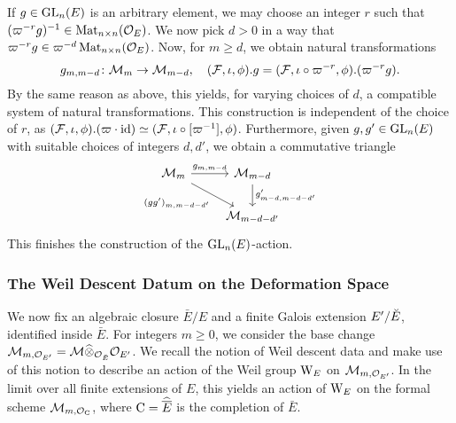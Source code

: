 \documentclass[../main.tex]{subfiles}
\begin{document}
If $g \in \operatorname{GL}_n(E)$ is an arbitrary element, we may choose an integer $r$ such
that $(\varpi^{-r} g)^{-1} \in \operatorname{Mat}_{n \times n}(\mathcal{O}_E)$. We now pick 
$d > 0$ in a way that $\varpi^{-r}g \in \varpi^{-d}\operatorname{Mat}_{n \times n}(\mathcal{O}_E)$. 
Now, for $m \geq d$, we obtain natural transformations
\begin{equation*}
  g_{m,m-d}\colon \mathcal{M}_{m} \to \mathcal{M}_{m-d}, \quad (\mathcal{F}, \iota, \phi).g = (\mathcal{F}, \iota \circ \varpi^{-r}, \phi).(\varpi^{-r}g).
\end{equation*}
By the same reason as above, this yields, for varying choices of $d$, a
compatible system of natural transformations.
This construction is independent of the choice of $r$, as $(\mathcal{F}, \iota,
\phi).(\varpi\cdot\operatorname{id}) \simeq (\mathcal{F}, \iota \circ [\varpi^{-1}], \phi)$.
Furthermore, given $g, g' \in \operatorname{GL}_n(E)$ with suitable choices of integers 
$d, d'$, we obtain a commutative triangle
\begin{equation*}
\begin{tikzcd}[ampersand replacement=\&]
	{\cM_{m}} \& {\cM_{m-d}} \\
	\& {\cM_{m-d-d'}}
	\arrow["{g_{m,m-d}}", from=1-1, to=1-2]
	\arrow["{(gg')_{m,m-d-d'}}"', from=1-1, to=2-2]
	\arrow["{g'_{m-d,m-d-d'}}", from=1-2, to=2-2]
\end{tikzcd}
\end{equation*}
This finishes the construction of the $\operatorname{GL}_n(E)$-action.


\subsubsection{The Weil Descent Datum on the Deformation Space} %
\label{ssub:The Weil Descent Datum}
We now fix an algebraic closure
$\bar E/E$ and a finite Galois extension $E'/{\breve {E}}$, identified inside $\bar E$. 
For integers $m \geq 0$, we consider the base change $\mathcal{M}_{m, \mathcal{O}_{{E'}}} = \mathcal{M}
\widehat \otimes_{\mathcal{O}_{\breve {E}}} \mathcal{O}_{{E'}}$. 
We recall the notion of Weil descent data and make use of this notion to describe
an action of the Weil group $\mathrm W_E$ on $\mathcal{M}_{m, \mathcal{O}_{{E'}}}$. In the 
limit over all finite extensions of $E$, this yields an action of $\mathrm W_E$ on the
formal scheme $\mathcal{M}_{m, \mathcal{O}_{{{\mathrm{C}}}}}$, where ${\mathrm{C}} = \widehat{\overline E}$  is the completion
of $\bar E$.
\end{document}

